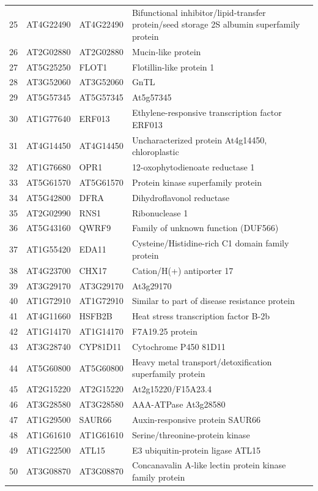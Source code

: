 \documentclass[11pt]{article}
\begin{document}
\begin{center}
\begin{tabular}{rlll}
25 & AT4G22490 & AT4G22490 & Bifunctional inhibitor/lipid-transfer protein/seed storage 2S albumin superfamily protein\\
26 & AT2G02880 & AT2G02880 & Mucin-like protein\\
27 & AT5G25250 & FLOT1 & Flotillin-like protein 1\\
28 & AT3G52060 & AT3G52060 & GnTL\\
29 & AT5G57345 & AT5G57345 & At5g57345\\
30 & AT1G77640 & ERF013 & Ethylene-responsive transcription factor ERF013\\
31 & AT4G14450 & AT4G14450 & Uncharacterized protein At4g14450, chloroplastic\\
32 & AT1G76680 & OPR1 & 12-oxophytodienoate reductase 1\\
33 & AT5G61570 & AT5G61570 & Protein kinase superfamily protein\\
34 & AT5G42800 & DFRA & Dihydroflavonol reductase\\
35 & AT2G02990 & RNS1 & Ribonuclease 1\\
36 & AT5G43160 & QWRF9 & Family of unknown function (DUF566)\\
37 & AT1G55420 & EDA11 & Cysteine/Histidine-rich C1 domain family protein\\
38 & AT4G23700 & CHX17 & Cation/H(+) antiporter 17\\
39 & AT3G29170 & AT3G29170 & At3g29170\\
40 & AT1G72910 & AT1G72910 & Similar to part of disease resistance protein\\
41 & AT4G11660 & HSFB2B & Heat stress transcription factor B-2b\\
42 & AT1G14170 & AT1G14170 & F7A19.25 protein\\
43 & AT3G28740 & CYP81D11 & Cytochrome P450 81D11\\
44 & AT5G60800 & AT5G60800 & Heavy metal transport/detoxification superfamily protein\\
45 & AT2G15220 & AT2G15220 & At2g15220/F15A23.4\\
46 & AT3G28580 & AT3G28580 & AAA-ATPase At3g28580\\
47 & AT1G29500 & SAUR66 & Auxin-responsive protein SAUR66\\
48 & AT1G61610 & AT1G61610 & Serine/threonine-protein kinase\\
49 & AT1G22500 & ATL15 & E3 ubiquitin-protein ligase ATL15\\
50 & AT3G08870 & AT3G08870 & Concanavalin A-like lectin protein kinase family protein\\

\end{tabular}
\end{center}
\end{document}
